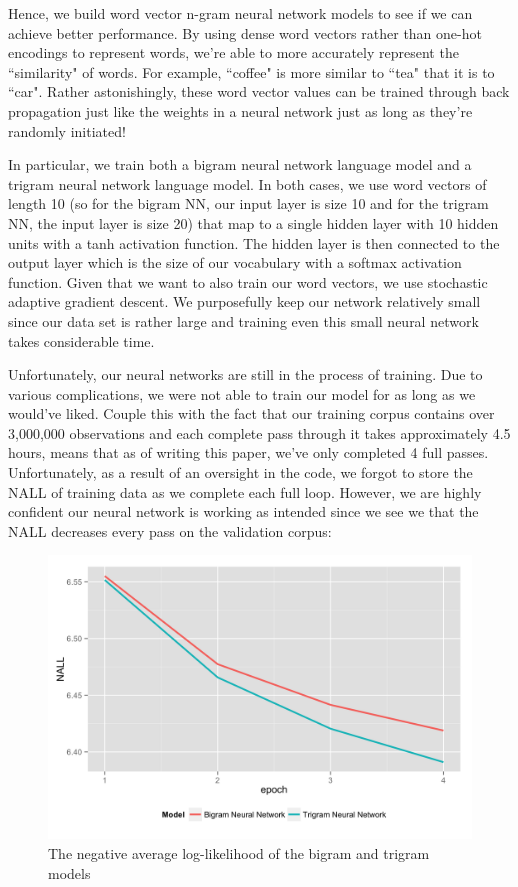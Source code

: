 \documentclass[fleqn,12pt]{SelfArx} %
\begin{document}
Hence, we build word vector n-gram neural network models to see if we can achieve better performance. By using dense word vectors rather than one-hot encodings to represent words, we're able to more accurately represent the ``similarity" of words. For example, ``coffee" is more similar to ``tea" that it is to ``car". Rather astonishingly, these word vector values can be trained through back propagation just like the weights in a neural network just as long as they're randomly initiated! 

 In particular, we train both a bigram neural network language model and a trigram neural network language model. In both cases, we use word vectors of length 10 (so for the bigram NN, our input layer is size 10 and for the trigram NN, the input layer is size 20) that map to a single hidden layer with 10 hidden units with a tanh activation function. The hidden layer is then connected to the output layer which is the size of our vocabulary with a softmax activation function. Given that we want to also train our word vectors, we use stochastic adaptive gradient descent. We purposefully keep our network relatively small since our data set is rather large and training even this small neural network takes considerable time. 
 
 Unfortunately, our neural networks are still in the process of training. Due to various complications, we were not able to train our model for as long as we would've liked. Couple this with the fact that our training corpus contains over 3,000,000 observations and each complete pass through it takes approximately 4.5 hours, means that as of writing this paper, we've only completed 4 full passes. Unfortunately, as a result of an oversight in the code, we forgot to store the NALL of training data as we complete each full loop. However, we are highly confident our neural network is working as intended since we see we that the NALL decreases every pass on the validation corpus:
 

\begin{figure}[ht]
\includegraphics[width=\linewidth]{nall.png}
\caption{The negative average log-likelihood of the bigram and trigram models}
\label{fig:perp_hist}
\end{figure}
 
\end{document}
